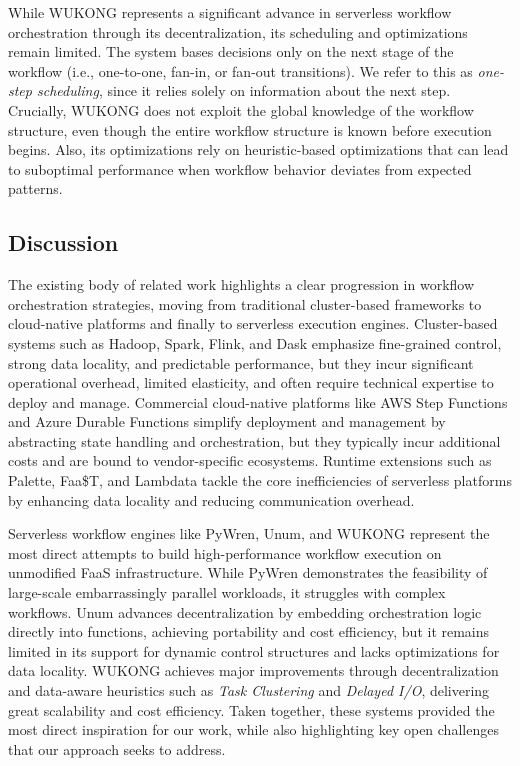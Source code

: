 \documentclass[conference]{IEEEtran}
\begin{document}
While WUKONG represents a significant advance in serverless workflow orchestration through its decentralization, its scheduling and optimizations remain limited. The system bases decisions only on the next stage of the workflow (i.e., one-to-one, fan-in, or fan-out transitions). We refer to this as \textit{one-step scheduling}, since it relies solely on information about the next step. Crucially, WUKONG does not exploit the global knowledge of the workflow structure, even though the entire workflow structure is known before execution begins. Also, its optimizations rely on heuristic-based optimizations that can lead to suboptimal performance when workflow behavior deviates from expected patterns.

\subsection{Discussion}
The existing body of related work highlights a clear progression in workflow orchestration strategies, moving from traditional cluster-based frameworks to cloud-native platforms and finally to serverless execution engines. Cluster-based systems such as Hadoop, Spark, Flink, and Dask emphasize fine-grained control, strong data locality, and predictable performance, but they incur significant operational overhead, limited elasticity, and often require technical expertise to deploy and manage. Commercial cloud-native platforms like AWS Step Functions and Azure Durable Functions simplify deployment and management by abstracting state handling and orchestration, but they typically incur additional costs and are bound to vendor-specific ecosystems. Runtime extensions such as Palette, Faa\$T, and Lambdata tackle the core inefficiencies of serverless platforms by enhancing data locality and reducing communication overhead.

Serverless workflow engines like PyWren, Unum, and WUKONG represent the most direct attempts to build high-performance workflow execution on unmodified FaaS infrastructure. While PyWren demonstrates the feasibility of large-scale embarrassingly parallel workloads, it struggles with complex workflows. Unum advances decentralization by embedding orchestration logic directly into functions, achieving portability and cost efficiency, but it remains limited in its support for dynamic control structures and lacks optimizations for data locality. WUKONG achieves major improvements through decentralization and data-aware heuristics such as \textit{Task Clustering} and \textit{Delayed I/O}, delivering great scalability and cost efficiency. Taken together, these systems provided the most direct inspiration for our work, while also highlighting key open challenges that our approach seeks to address.
\end{document}
